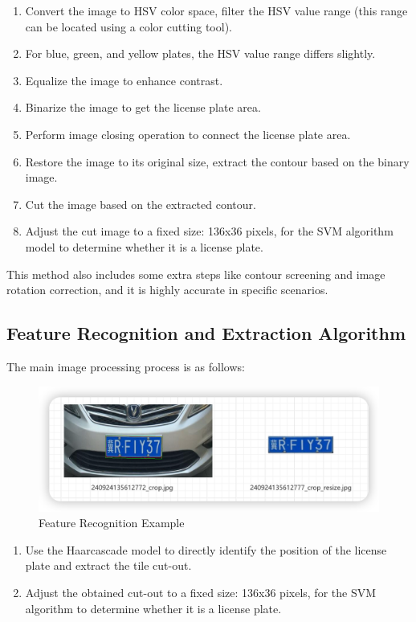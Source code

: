 \documentclass{article}
\begin{document}
	\begin{enumerate}
		\item Convert the image to HSV color space, filter the HSV value range (this range can be located using a color cutting tool).
		\item For blue, green, and yellow plates, the HSV value range differs slightly.
		\item Equalize the image to enhance contrast.
		\item Binarize the image to get the license plate area.
		\item Perform image closing operation to connect the license plate area.
		\item Restore the image to its original size, extract the contour based on the binary image.
		\item Cut the image based on the extracted contour.
		\item Adjust the cut image to a fixed size: 136x36 pixels, for the SVM algorithm model to determine whether it is a license plate.
	\end{enumerate}
	
	This method also includes some extra steps like contour screening and image rotation correction, and it is highly accurate in specific scenarios.
	
	\subsection{Feature Recognition and Extraction Algorithm}
	The main image processing process is as follows:
	
	\begin{figure}[H]
		\centering
		\includegraphics[width=\linewidth]{mdpic/image-20240924230957298.png}
		\caption{Feature Recognition Example}
	\end{figure}
	
	\begin{enumerate}
		\item Use the Haarcascade model to directly identify the position of the license plate and extract the tile cut-out.
		\item Adjust the obtained cut-out to a fixed size: 136x36 pixels, for the SVM algorithm to determine whether it is a license plate.
	\end{enumerate}
	
\end{document}
